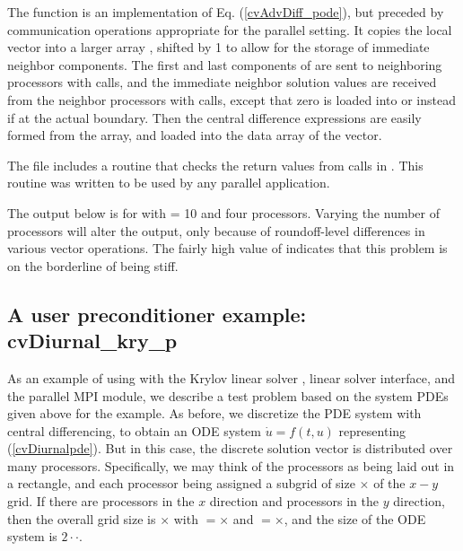 The  function is an implementation of Eq. (\ref{cvAdvDiff_pode}), but preceded
by communication operations appropriate for the parallel setting.
It copies the local vector  into a larger array , shifted by 1
to allow for the storage of immediate neighbor components.  The first and last
components of  are sent to neighboring processors with  calls,
and the immediate neighbor solution values are received from the neighbor
processors with  calls, except that zero is loaded into 
or  instead if at the actual boundary.  Then the central
difference expressions are easily formed from the  array, and loaded into
the data array of the  vector.

The  file includes a routine  that checks the
return values from calls in .  This routine was written to be used
by any parallel {\sundials} application.

The output below is for  with  = 10 and four processors.
Varying the number of processors will alter the output, only because
of roundoff-level differences in various vector operations.  The fairly
high value of  indicates that this problem is on the borderline
of being stiff.



\subsection{A user preconditioner example: cvDiurnal\_kry\_p}\label{ss:cvDiurnal_p}

As an example of using {\cvode} with the Krylov linear solver
{\sunlinsolspgmr}, {\cvls} linear solver interface, and
the parallel MPI {\nvecp} module, we describe a test problem based on
the system PDEs given above for the  example.
As before, we discretize the PDE system with central differencing, to
obtain an ODE system $\dot{u} = f(t,u)$ representing (\ref{cvDiurnalpde}).
But in this case, the discrete solution vector is distributed over
many processors.  Specifically, we may think of the processors as
being laid out in a rectangle, and each processor being assigned a
subgrid of size $\times$ of the $x-y$ grid. If
there are  processors in the $x$ direction and 
processors in the $y$ direction, then the overall grid size is
$\times$ with $=$$\times$ and
$=$$\times$, and the size of the ODE system is
$2\cdot$$\cdot$.

